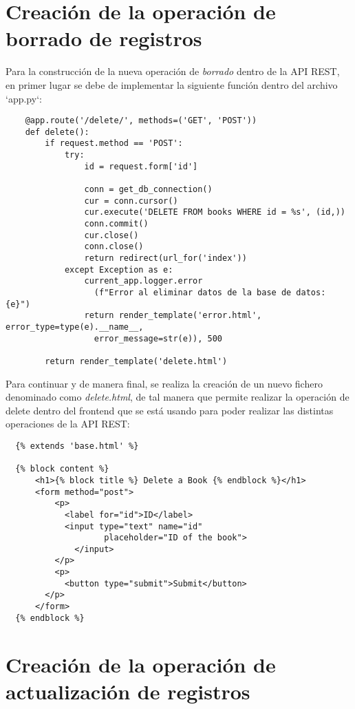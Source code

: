 \documentclass[11pt]{report}
\begin{document}
\section{Creación de la operación de borrado de registros}

Para la construcción de la nueva operación de \emph{borrado} dentro de la API REST, en primer lugar se debe de implementar la siguiente función dentro del archivo `app.py`:

\begin{verbatim}
    @app.route('/delete/', methods=('GET', 'POST'))
    def delete():
        if request.method == 'POST':
            try:
                id = request.form['id']
                
                conn = get_db_connection()
                cur = conn.cursor()
                cur.execute('DELETE FROM books WHERE id = %s', (id,))
                conn.commit()
                cur.close()
                conn.close()
                return redirect(url_for('index'))
            except Exception as e:
                current_app.logger.error
                  (f"Error al eliminar datos de la base de datos: {e}")
                return render_template('error.html', error_type=type(e).__name__, 
                  error_message=str(e)), 500
    
        return render_template('delete.html')
  \end{verbatim}

Para continuar y de manera final, se realiza la creación de un nuevo fichero denominado como \emph{delete.html}, de tal manera que permite realizar la operación de delete dentro del frontend que se está usando para poder realizar las distintas operaciones de la API REST:

\begin{verbatim}
  {% extends 'base.html' %}

  {% block content %}
      <h1>{% block title %} Delete a Book {% endblock %}</h1>
      <form method="post">
          <p>
            <label for="id">ID</label>
            <input type="text" name="id"
                    placeholder="ID of the book">
              </input>
          </p>
          <p>
            <button type="submit">Submit</button>
        </p>
      </form>
  {% endblock %}
  \end{verbatim}

\section{Creación de la operación de actualización de registros}
\end{document}

